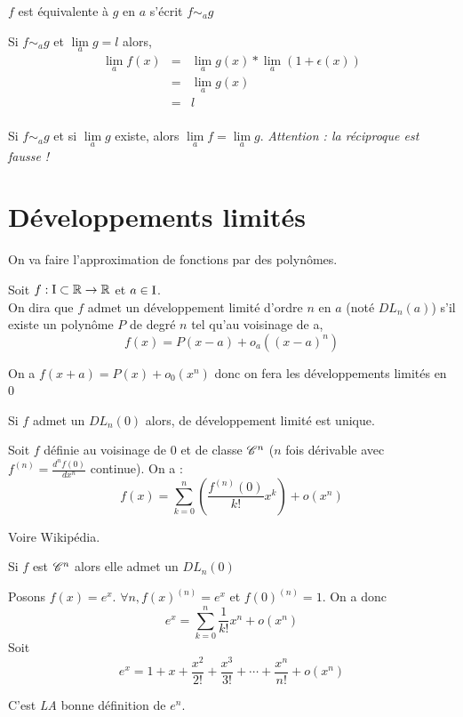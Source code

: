 \notation{}
$f$ est équivalente à $g$ en $a$ s'écrit $f\sim_{a}g$

\remarque{}
Si $f\sim_{a}g$ et $\lim\limits_ag=l$ alors,
\begin{eqnarray*}
		\lim\limits_a f(x) &=& \lim\limits_a g(x) *\lim\limits_a(1+\epsilon(x))\\
		& = & \lim\limits_a g(x)\\
		&=&l\\
\end{eqnarray*}

\proposition{}
Si $f\sim_ag$ et si $\lim\limits_ag$ existe, alors $\lim\limits_af=\lim\limits_ag$. \emph{Attention : la réciproque est fausse !}

\demonstration{}
\exemple{}

\section{Développements limités}
\idee{}
On va faire l'approximation de fonctions par des polynômes.

Soit $f:\text{I} \subset \mathbb{R} \to \mathbb{R}$ et $a\in \text{I}$.\\
On dira que $f$ admet un développement limité d'ordre $n$ en $a$ (noté $DL_n(a)$) s'il existe un polynôme $P$ de degré $n$ tel qu'au voisinage de a,
$$f(x) = P(x-a) + o_a((x-a)^n)$$

\remarque{}
On a $f(x+a) = P(x) + o_0(x^n)$ donc on fera les développements limités en 0

\prop{}
Si $f$ admet un $DL_n(0)$ alors, de développement limité est unique.

\demonstration{}
\exemple{}

Soit $f$ définie au voisinage de 0 et de classe $\mathscr{C}^n$ ($n$ fois dérivable avec $f^{(n)}=\frac{d^nf(0)}{dx^n}$ continue). On a :
$$f(x)=\sum_{k=0}^n{\left(\frac{f^{(n)}(0)}{k!}x^k\right)}+o(x^n)$$

\demonstration{}
Voire Wikipédia.

\corollaire{}
Si $f$ est $\mathscr{C}^n$ alors elle admet un $DL_n(0)$

\exemple{}
Posons $f(x)=e^x$. $\forall n,f(x)^{(n)} = e^x$ et $f(0)^{(n)} = 1$. On a donc
$$e^x = \sum_{k=0}^n{\frac{1}{k!}x^n}+o(x^n)$$
Soit
$$e^x=1+x+\frac{x^2}{2!}+\frac{x^3}{3!}+\cdots+\frac{x^n}{n!}+o(x^n)$$

\remarque{}
C'est \emph{LA} bonne définition de $e^n$.

\exemple{}

